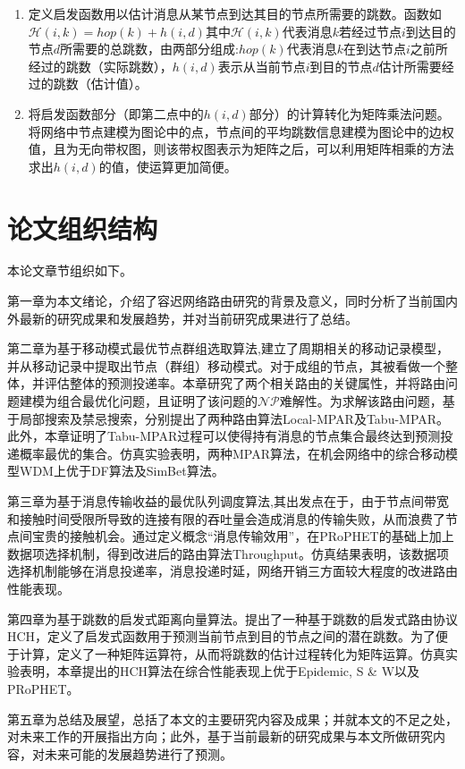 \begin{itemize}
\begin{enumerate}
\item 定义启发函数用以估计消息从某节点到达其目的节点所需要的跳数。函数如$
\label{eq:Hh}
\mathcal{H}(i,k) = hop(k) + h(i, d)
$其中$\mathcal{H}(i,k)$代表消息$k$若经过节点$i$到达目的节点$d$所需要的总跳数，由两部分组成:$hop(k)$代表消息$k$在到达节点$i$之前所经过的跳数（实际跳数），$h(i,d)$表示从当前节点$i$到目的节点$d$估计所需要经过的跳数（估计值）。

\item 将启发函数部分（即第二点中的$h(i,d)$部分）的计算转化为矩阵乘法问题。将网络中节点建模为图论中的点，节点间的平均跳数信息建模为图论中的边权值，且为无向带权图，则该带权图表示为矩阵之后，可以利用矩阵相乘的方法求出$h(i,d)$的值，使运算更加简便。
\end{enumerate}
\end{itemize}


\section{论文组织结构}

本论文章节组织如下。

第一章为本文绪论，介绍了容迟网络路由研究的背景及意义，同时分析了当前国内外最新的研究成果和发展趋势，并对当前研究成果进行了总结。

第二章为基于移动模式最优节点群组选取算法,建立了周期相关的移动记录模型，并从移动记录中提取出节点（群组）移动模式。对于成组的节点，其被看做一个整体，并评估整体的预测投递率。本章研究了两个相关路由的关键属性，并将路由问题建模为组合最优化问题，且证明了该问题的$\mathcal{NP}$难解性。为求解该路由问题，基于局部搜索及禁忌搜索，分别提出了两种路由算法Local-MPAR及Tabu-MPAR。此外，本章证明了Tabu-MPAR过程可以使得持有消息的节点集合最终达到预测投递概率最优的集合。仿真实验表明，两种MPAR算法，在机会网络中的综合移动模型WDM上优于DF算法及SimBet算法。

第三章为基于消息传输收益的最优队列调度算法,其出发点在于，由于节点间带宽和接触时间受限所导致的连接有限的吞吐量会造成消息的传输失败，从而浪费了节点间宝贵的接触机会。通过定义概念“消息传输效用”，在PRoPHET的基础上加上数据项选择机制，得到改进后的路由算法Throughput。仿真结果表明，该数据项选择机制能够在消息投递率，消息投递时延，网络开销三方面较大程度的改进路由性能表现。

第四章为基于跳数的启发式距离向量算法。提出了一种基于跳数的启发式路由协议HCH，定义了启发式函数用于预测当前节点到目的节点之间的潜在跳数。为了便于计算，定义了一种矩阵运算符，从而将跳数的估计过程转化为矩阵运算。仿真实验表明，本章提出的HCH算法在综合性能表现上优于Epidemic, S \& W以及PRoPHET。

第五章为总结及展望，总括了本文的主要研究内容及成果；并就本文的不足之处，对未来工作的开展指出方向；此外，基于当前最新的研究成果与本文所做研究内容，对未来可能的发展趋势进行了预测。
